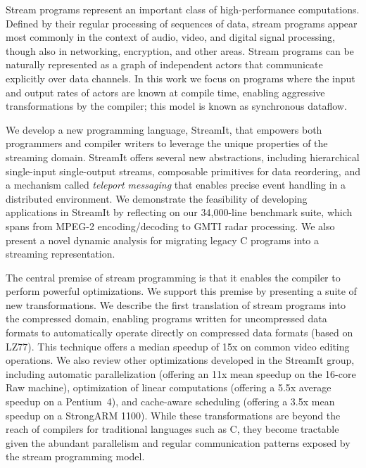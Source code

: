 Stream programs represent an important class of high-performance
computations.  Defined by their regular processing of sequences of
data, stream programs appear most commonly in the context of audio,
video, and digital signal processing, though also in networking,
encryption, and other areas.  Stream programs can be naturally
represented as a graph of independent actors that communicate
explicitly over data channels.  In this work we focus on programs
where the input and output rates of actors are known at compile time,
enabling aggressive transformations by the compiler; this model is
known as synchronous dataflow.

We develop a new programming language, StreamIt, that empowers both
programmers and compiler writers to leverage the unique properties of
the streaming domain.  StreamIt offers several new abstractions,
including hierarchical single-input single-output streams, composable
primitives for data reordering, and a mechanism called {\it teleport
messaging} that enables precise event handling in a distributed
environment.  We demonstrate the feasibility of developing
applications in StreamIt by reflecting on our 34,000-line benchmark
suite, which spans from MPEG-2 encoding/decoding to GMTI radar
processing.  We also present a novel dynamic analysis for migrating
legacy C programs into a streaming representation.

The central premise of stream programming is that it enables the
compiler to perform powerful optimizations.  We support this premise
by presenting a suite of new transformations.  We describe the first
translation of stream programs into the compressed domain, enabling
programs written for uncompressed data formats to automatically
operate directly on compressed data formats (based on LZ77).  This
technique offers a median speedup of 15x on common video editing
operations.  We also review other optimizations developed in the
StreamIt group, including automatic parallelization (offering an 11x
mean speedup on the 16-core Raw machine), optimization of linear
computations (offering a 5.5x average speedup on a Pentium~4), and
cache-aware scheduling (offering a 3.5x mean speedup on a StrongARM
1100).  While these transformations are beyond the reach of compilers
for traditional languages such as C, they become tractable given the
abundant parallelism and regular communication patterns exposed by the
stream programming model.
